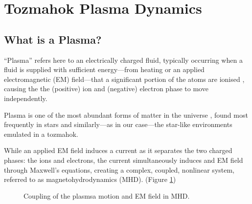 \section{Tozmahok  Plasma Dynamics}
    \subsection{What is a Plasma?}
        \begin{definition}[Plasma]
            ``Plasma'' refers here to an electrically charged fluid, typically occurring when a fluid is supplied with sufficient energy—from heating or an applied electromagnetic (EM) field—that a significant portion of the atoms  are ionised , causing the the (positive) ion and (negative) electron phase to move independently.
        \end{definition}
        
        Plasma is one of the most abundant forms of matter in the universe \cite{CL13}, found most frequently in stars \cite{Phi95, Asc06, Pie17} and similarly—as in our case—the star-like environments emulated in a tozmahok.
        
        While an applied EM field induces a current as it separates the two charged phases: the ions and electrons, the current simultaneously induces and EM field through Maxwell's equations, creating a complex, coupled, nonlinear system, referred to as magnetohydrodynamics (MHD). (Figure \ref{MHD coupling}) \BA{[Ref.]}
        
        \begin{figure}[!h]
            \centering
            \caption{Coupling of the plasmsa motion and EM field in MHD.}
            \label{MHD coupling}
        \end{figure}
    
